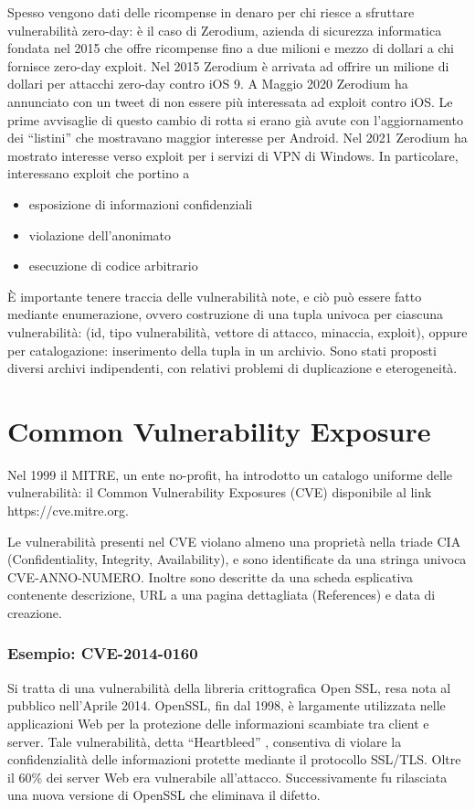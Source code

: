 Spesso vengono dati delle ricompense in denaro per chi riesce a sfruttare vulnerabilità zero-day: è il caso di Zerodium, azienda di sicurezza informatica fondata nel 2015 che offre ricompense fino a due milioni e mezzo di dollari a chi fornisce zero-day exploit. Nel 2015 Zerodium è arrivata ad offrire un milione di
dollari per attacchi zero-day contro iOS 9. A Maggio 2020 Zerodium ha annunciato con un tweet
di non essere più interessata ad exploit contro iOS. Le prime avvisaglie di questo cambio di rotta si erano
già avute con l’aggiornamento dei “listini” che
mostravano maggior interesse per Android. Nel 2021 Zerodium ha mostrato interesse verso
exploit per i servizi di VPN di Windows. In particolare, interessano exploit che portino a
\begin{itemize}
    \item esposizione di informazioni confidenziali
    \item violazione dell’anonimato
    \item esecuzione di codice arbitrario
\end{itemize}
È importante tenere traccia delle vulnerabilità note, e ciò può essere fatto mediante enumerazione, ovvero costruzione di una tupla univoca per ciascuna vulnerabilità: (id, tipo vulnerabilità, vettore di attacco, minaccia, exploit), oppure per catalogazione: inserimento della tupla in un archivio. Sono stati proposti diversi archivi indipendenti, con relativi problemi di duplicazione e eterogeneità.

\section{Common Vulnerability Exposure}
Nel 1999 il MITRE, un ente no-profit, ha introdotto un
catalogo uniforme delle vulnerabilità: il Common Vulnerability Exposures (CVE)
disponibile al link https://cve.mitre.org.

Le vulnerabilità presenti nel CVE violano almeno una proprietà nella triade CIA (Confidentiality, Integrity, Availability), e sono identificate da una stringa univoca CVE-ANNO-NUMERO. Inoltre sono descritte da una scheda esplicativa contenente descrizione, URL a una pagina dettagliata (References) e data di creazione.

\vspace{5mm}

\subsubsection{Esempio: CVE-2014-0160}
Si tratta di una vulnerabilità della libreria
crittografica Open SSL, resa nota al
pubblico nell’Aprile 2014. OpenSSL, fin dal 1998, è largamente utilizzata nelle
applicazioni Web per la protezione delle informazioni
scambiate tra client e server. Tale vulnerabilità, detta “Heartbleed”
,
consentiva di violare la confidenzialità delle
informazioni protette mediante il protocollo SSL/TLS. Oltre il 60\% dei server Web era vulnerabile all’attacco. Successivamente fu rilasciata una nuova versione di
OpenSSL che eliminava il difetto.


